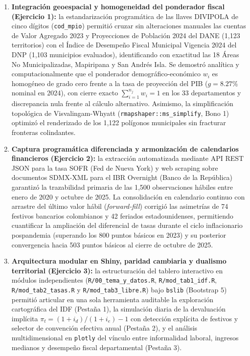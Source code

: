 \documentclass[
  10pt,
  letterpaper,
  DIV=11,
  numbers=noendperiod]{scrartcl}
\providecommand{\tightlist}{%
  \setlength{\itemsep}{0pt}\setlength{\parskip}{0pt}}
\begin{document}
\begin{enumerate}
\def\labelenumi{\arabic{enumi}.}
\tightlist
\item
  \textbf{Integración geoespacial y homogeneidad del ponderador fiscal
  (Ejercicio 1):} la estandarización programática de las llaves DIVIPOLA
  de cinco dígitos (\texttt{cod\_mpio}) permitió cruzar sin alteraciones
  manuales las cuentas de Valor Agregado 2023 y Proyecciones de
  Población 2024 del DANE (1,123 territorios) con el Índice de Desempeño
  Fiscal Municipal Vigencia 2024 del DNP (1,103 municipios evaluados),
  identificando con exactitud las 18 Áreas No Municipalizadas,
  Mapiripana y San Andrés Isla. Se demostró analítica y
  computacionalmente que el ponderador demográfico-económico \(w_i\) es
  homogéneo de grado cero frente a la tasa de proyección del PIB
  (\(g = 8.27\%\) nominal en 2024), con cierre exacto
  \(\sum_{i=1}^{n_j} w_i = 1\) en los 33 departamentos y discrepancia
  nula frente al cálculo alternativo. Asimismo, la simplificación
  topológica de Visvalingam-Whyatt (\texttt{rmapshaper::ms\_simplify},
  Bono 1) optimizó el renderizado de los 1,122 polígonos municipales sin
  fracturar fronteras colindantes.
\item
  \textbf{Captura programática diferenciada y armonización de
  calendarios financieros (Ejercicio 2):} la extracción automatizada
  mediante API REST JSON para la tasa SOFR (Fed de Nueva York) y web
  scraping sobre documentos SDMX-XML para el IBR Overnight (Banco de la
  República) garantizó la trazabilidad primaria de las 1,500
  observaciones hábiles entre enero de 2020 y octubre de 2025. La
  consolidación en calendario continuo con arrastre del último valor
  hábil (\emph{forward-fill}) corrigió las asimetrías de 74 festivos
  bancarios colombianos y 42 feriados estadounidenses, permitiendo
  cuantificar la ampliación del diferencial de tasas durante el ciclo
  inflacionario pospandemia (superando los 800 puntos básicos en 2023) y
  su posterior convergencia hacia 503 puntos básicos al cierre de
  octubre de 2025.
\item
  \textbf{Arquitectura modular en Shiny, paridad cambiaria y dualismo
  territorial (Ejercicio 3):} la estructuración del tablero interactivo
  en módulos independientes (\texttt{R/00\_tema\_y\_datos.R},
  \texttt{R/mod\_tab1\_idf.R}, \texttt{R/mod\_tab2\_tasas.R} y
  \texttt{R/mod\_tab3\_libre.R}) bajo \texttt{bslib} (Bootstrap 5)
  permitió articular en una sola herramienta auditable la exploración
  cartográfica del IDF (Pestaña 1), la simulación diaria de la
  devaluación implícita \(\pi_t = (1 + i_d)/(1 + i_e) - 1\) con
  detección explícita de festivos y selector de convención efectiva
  anual (Pestaña 2), y el análisis multidimensional en \texttt{plotly}
  del vínculo entre informalidad laboral, ingresos medianos y desempeño
  fiscal departamental (Pestaña 3).
\end{enumerate}
\end{document}
